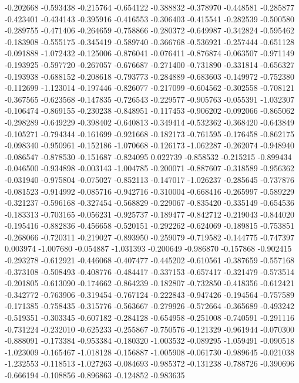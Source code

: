 -0.202668
-0.593438
-0.215764
-0.654122
-0.388832
-0.378970
-0.448581
-0.285877
-0.423401
-0.434143
-0.395916
-0.416553
-0.306403
-0.415541
-0.282539
-0.500580
-0.289755
-0.471406
-0.264659
-0.758866
-0.280372
-0.649987
-0.342824
-0.595462
-0.183908
-0.555175
-0.345419
-0.589740
-0.366768
-0.536921
-0.257444
-0.651128
-0.091888
-1.072432
-0.125006
-0.876041
-0.076411
-0.876874
-0.063507
-0.971149
-0.193925
-0.597720
-0.267057
-0.676687
-0.271400
-0.731890
-0.331814
-0.656327
-0.193938
-0.688152
-0.208618
-0.793773
-0.284889
-0.683603
-0.149972
-0.752380
-0.112699
-1.123014
-0.197446
-0.826077
-0.217099
-0.604562
-0.302558
-0.708121
-0.367565
-0.623568
-0.147835
-0.726543
-0.229577
-0.905763
-0.055391
-1.032307
-0.106474
-0.869155
-0.230238
-0.848951
-0.117453
-0.906202
-0.092066
-0.865062
-0.298289
-0.649229
-0.398402
-0.640813
-0.349414
-0.532362
-0.368420
-0.643849
-0.105271
-0.794344
-0.161699
-0.921668
-0.182173
-0.761595
-0.176458
-0.862175
-0.098340
-0.950961
-0.152186
-1.070668
-0.126173
-1.062287
-0.262074
-0.948940
-0.086547
-0.878530
-0.151687
-0.824095
0.022739
-0.858532
-0.215215
-0.899434
-0.046500
-0.934898
-0.003143
-1.004785
-0.200071
-0.887607
-0.318589
-0.956362
-0.031940
-0.975804
-0.075027
-0.852113
-0.147017
-1.026237
-0.285645
-0.737876
-0.081523
-0.914992
-0.085716
-0.942716
-0.310004
-0.668416
-0.265997
-0.589229
-0.321237
-0.596168
-0.327454
-0.568829
-0.229067
-0.835420
-0.335149
-0.654536
-0.183313
-0.703165
-0.056231
-0.925737
-0.189477
-0.842712
-0.219043
-0.844020
-0.195416
-0.882836
-0.456658
-0.520151
-0.292262
-0.624069
-0.189815
-0.753851
-0.268066
-0.720311
-0.219027
-0.893950
-0.259079
-0.719582
-0.144775
-0.747397
0.003974
-1.007680
-0.054887
-1.031393
-0.200649
-0.986870
-0.157868
-0.902415
-0.293278
-0.612921
-0.446068
-0.407477
-0.445202
-0.610561
-0.387659
-0.557168
-0.373108
-0.508493
-0.408776
-0.484417
-0.337153
-0.657417
-0.321479
-0.573514
-0.201805
-0.613090
-0.174662
-0.864239
-0.182807
-0.732850
-0.418356
-0.612421
-0.342772
-0.763906
-0.319454
-0.767124
-0.222843
-0.947426
-0.194564
-0.757589
-0.171385
-0.758435
-0.315776
-0.563667
-0.279926
-0.572664
-0.365689
-0.493242
-0.519351
-0.303345
-0.607182
-0.284128
-0.654958
-0.251008
-0.740591
-0.291116
-0.731224
-0.232010
-0.625233
-0.255867
-0.750576
-0.121329
-0.961944
-0.070300
-0.888091
-0.173384
-0.953384
-0.180320
-1.003532
-0.089295
-1.059491
-0.090518
-1.023009
-0.165467
-1.018128
-0.156887
-1.005908
-0.061730
-0.989645
-0.021038
-1.232553
-0.118513
-1.027263
-0.084693
-0.985372
-0.131238
-0.788726
-0.390696
-0.666194
-0.108856
-0.896863
-0.124852
-0.983635
